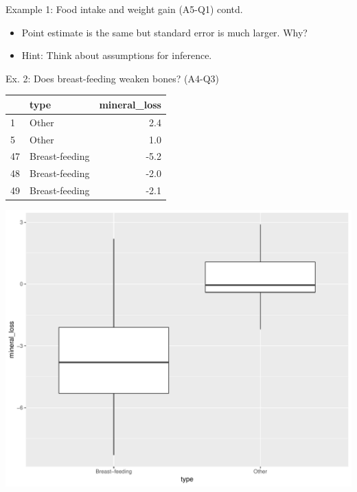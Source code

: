 \documentclass{beamer}\usepackage[]{graphicx}\usepackage[]{color}
\newenvironment{knitrout}{}{} %
\begin{document}
\begin{frame}[fragile]{Example 1: Food intake and weight gain (A5-Q1) contd.}
\begin{minipage}{0.5\textwidth}
\begin{knitrout}
\end{knitrout}

	\begin{itemize}
	\small
	\setlength\itemsep{2em}
	\item Point estimate is the same but standard error is much larger. Why? \pause 
	\item Hint: Think about assumptions for inference.
\end{itemize}

\end{minipage}

\end{frame}



\begin{frame}[fragile]{Ex. 2: Does breast-feeding weaken bones? (A4-Q3)}

\begin{minipage}{0.47\textwidth}
\begin{knitrout}\scriptsize
{}\color{fgcolor}
\begin{tabular}{l|l|r}
\hline
  & type & mineral\_loss\\
\hline
1 & Other & 2.4\\
\hline
5 & Other & 1.0\\
\hline
47 & Breast-feeding & -5.2\\
\hline
48 & Breast-feeding & -2.0\\
\hline
49 & Breast-feeding & -2.1\\
\hline
\end{tabular}



{\centering \includegraphics[width=1\linewidth]{figure/unnamed-chunk-13-1} 

}
\end{knitrout}
\end{minipage}
\end{frame}
\end{document}
